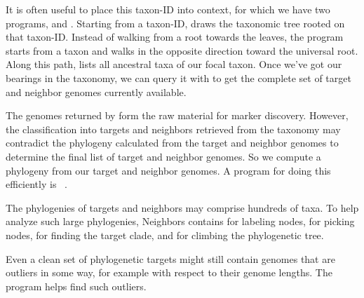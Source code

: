 It is often useful to place this taxon-ID into context, for which we
have two programs,  and . Starting from a
taxon-ID,  draws the taxonomic tree rooted on that
taxon-ID. Instead of walking from a root towards the leaves, the
program  starts from a taxon and walks in the opposite
direction toward the universal root. Along this path,  lists
all ancestral taxa of our focal taxon. Once we've got our bearings in
the taxonomy, we can query it with  to get the complete
set of target and neighbor genomes currently available.

The genomes returned by  form the raw material for
marker discovery. However, the classification into targets and
neighbors retrieved from the taxonomy may contradict the phylogeny
calculated from the target and neighbor genomes to determine the final
list of target and neighbor genomes. So we compute a phylogeny from
our target and neighbor genomes. A program for doing this efficiently
is ~\cite{klo20:phy}.

The phylogenies of targets and neighbors may comprise hundreds of
taxa. To help analyze such large phylogenies, Neighbors
contains  for labeling nodes,  for picking nodes,
 for finding the target clade, and  for climbing
the phylogenetic tree.

Even a clean set of phylogenetic targets might still contain genomes
that are outliers in some way, for example with respect to their
genome lengths. The program  helps find such
outliers.
